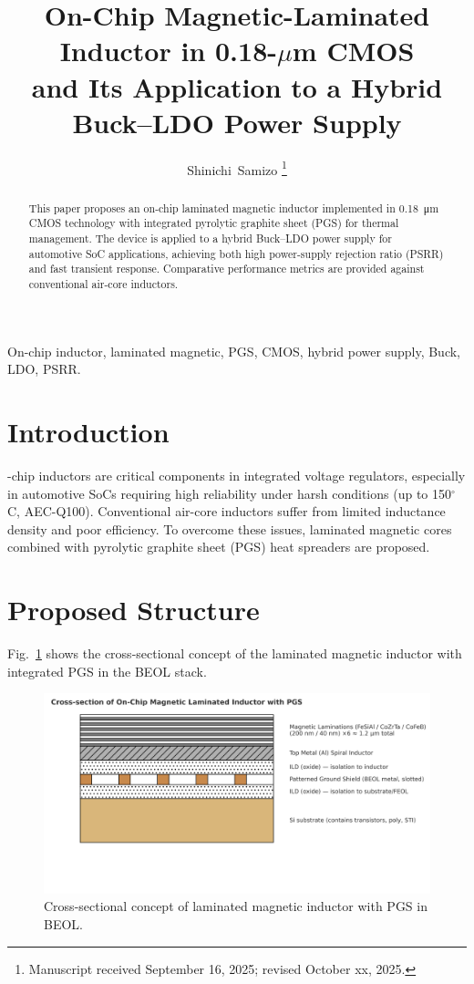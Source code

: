\documentclass[journal]{IEEEtran}
\begin{document}
\title{On-Chip Magnetic-Laminated Inductor in 0.18-$\mu$m CMOS\\
and Its Application to a Hybrid Buck--LDO Power Supply}

\author{Shinichi~Samizo%
\thanks{Manuscript received September 16, 2025; revised October xx, 2025.}%
}

\maketitle

\begin{abstract}
This paper proposes an on-chip laminated magnetic inductor implemented in \SI{0.18}{\micro\meter} CMOS technology with integrated pyrolytic graphite sheet (PGS) for thermal management. The device is applied to a hybrid Buck--LDO power supply for automotive SoC applications, achieving both high power-supply rejection ratio (PSRR) and fast transient response. Comparative performance metrics are provided against conventional air-core inductors.
\end{abstract}

\begin{IEEEkeywords}
On-chip inductor, laminated magnetic, PGS, CMOS, hybrid power supply, Buck, LDO, PSRR.
\end{IEEEkeywords}

\section{Introduction}
-chip inductors are critical components in integrated voltage regulators, especially in automotive SoCs requiring high reliability under harsh conditions (up to 150$^\circ$C, AEC-Q100). Conventional air-core inductors suffer from limited inductance density and poor efficiency. To overcome these issues, laminated magnetic cores combined with pyrolytic graphite sheet (PGS) heat spreaders are proposed.

\section{Proposed Structure}
Fig.~\ref{fig1} shows the cross-sectional concept of the laminated magnetic inductor with integrated PGS in the BEOL stack.

\begin{figure}[!t]
\centering
\includegraphics[width=0.8\linewidth]{fig/fig1_laminated_cross_section.png}
\caption{Cross-sectional concept of laminated magnetic inductor with PGS in BEOL.}
\label{fig1}
\end{figure}
\end{document}
